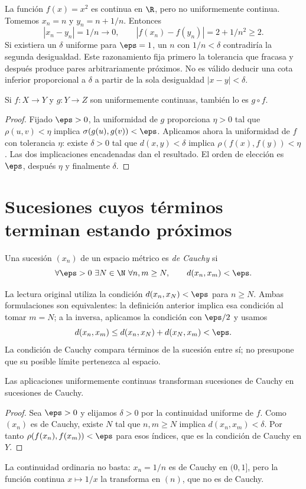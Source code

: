 \begin{ejemplo}\label{ch07:cuadrado}
La función $f(x)=x^2$ es continua en $\R$, pero no uniformemente continua. Tomemos $x_n=n$ y $y_n=n+1/n$. Entonces
\[
 |x_n-y_n|=1/n\longrightarrow0,
 \qquad |f(x_n)-f(y_n)|=2+1/n^2\geq2.
\]
Si existiera un $\delta$ uniforme para $\eps=1$, un $n$ con $1/n<\delta$ contradiría la segunda desigualdad. Este razonamiento fija primero la tolerancia que fracasa y después produce pares arbitrariamente próximos. No es válido deducir una cota inferior proporcional a $\delta$ a partir de la sola desigualdad $|x-y|<\delta$.
\end{ejemplo}

\begin{proposicion}[Composición]\label{ch07:composicion}
Si $f:X\to Y$ y $g:Y\to Z$ son uniformemente continuas, también lo es $g\circ f$.
\end{proposicion}
\begin{proof}
Fijado $\eps>0$, la uniformidad de $g$ proporciona $\eta>0$ tal que $\rho(u,v)<\eta$ implica $\sigma(g(u),g(v))<\eps$. Aplicamos ahora la uniformidad de $f$ con tolerancia $\eta$: existe $\delta>0$ tal que $d(x,y)<\delta$ implica $\rho(f(x),f(y))<\eta$. Las dos implicaciones encadenadas dan el resultado. El orden de elección es $\eps$, después $\eta$ y finalmente $\delta$.
\end{proof}

\section{Sucesiones cuyos términos terminan estando próximos}
\begin{definicion}\label{ch07:cauchy}
Una sucesión $(x_n)$ de un espacio métrico es \emph{de Cauchy} si
\[
 \forall\eps>0\ \exists N\in\N\ \forall n,m\geq N,
 \qquad d(x_n,x_m)<\eps.
\]
\end{definicion}
La lectura original utiliza la condición $d(x_n,x_N)<\eps$ para $n\geq N$. Ambas formulaciones son equivalentes: la definición anterior implica esa condición al tomar $m=N$; a la inversa, aplicamos la condición con $\eps/2$ y usamos
\[
 d(x_n,x_m)\leq d(x_n,x_N)+d(x_N,x_m)<\eps.
\]
La condición de Cauchy compara términos de la sucesión entre sí; no presupone que su posible límite pertenezca al espacio.

\begin{teorema}\label{ch07:cauchy-imagen}
Las aplicaciones uniformemente continuas transforman sucesiones de Cauchy en sucesiones de Cauchy.
\end{teorema}
\begin{proof}
Sea $\eps>0$ y elijamos $\delta>0$ por la continuidad uniforme de $f$. Como $(x_n)$ es de Cauchy, existe $N$ tal que $n,m\geq N$ implica $d(x_n,x_m)<\delta$. Por tanto $\rho(f(x_n),f(x_m))<\eps$ para esos índices, que es la condición de Cauchy en $Y$.
\end{proof}
La continuidad ordinaria no basta: $x_n=1/n$ es de Cauchy en $(0,1]$, pero la función continua $x\mapsto1/x$ la transforma en $(n)$, que no es de Cauchy.

